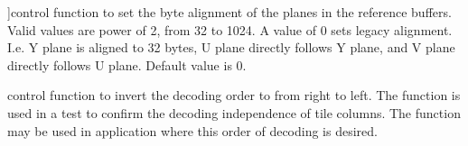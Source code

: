 \begin{Desc}
\begin{description}
{}]control function to set the byte alignment of the planes in the reference buffers. Valid values are power of 2, from 32 to 1024. A value of 0 sets legacy alignment. I.\+e. Y plane is aligned to 32 bytes, U plane directly follows Y plane, and V plane directly follows U plane. Default value is 0. \item[{\em 
A\+V1\+\_\+\+I\+N\+V\+E\+R\+T\+\_\+\+T\+I\+L\+E\+\_\+\+D\+E\+C\+O\+D\+E\+\_\+\+O\+R\+D\+ER\hypertarget{group__aom__decoder_gga3865fd4b3192489baa9a5c3632ebe97bac19ffcb187b1e1b5eee18499a97f69d2}{}\label{group__aom__decoder_gga3865fd4b3192489baa9a5c3632ebe97bac19ffcb187b1e1b5eee18499a97f69d2}
}]control function to invert the decoding order to from right to left. The function is used in a test to confirm the decoding independence of tile columns. The function may be used in application where this order of decoding is desired.


\end{description}
\end{Desc}

